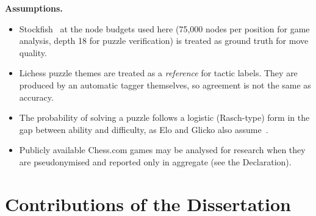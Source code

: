 \noindent\textbf{Assumptions.}
\begin{itemize}
  \item Stockfish~\cite{stockfish} at the node budgets used here (75,000 nodes per position for game
        analysis, depth 18 for puzzle verification) is treated as ground truth for move quality.
  \item Lichess puzzle themes are treated as a \emph{reference} for tactic labels. They are produced
        by an automatic tagger themselves, so agreement is not the same as accuracy.
  \item The probability of solving a puzzle follows a logistic (Rasch-type) form in the gap between
        ability and difficulty, as Elo and Glicko also assume~\cite{elo1978rating,glickman1999parameter}.
  \item Publicly available Chess.com games may be analysed for research when they are pseudonymised
        and reported only in aggregate (see the Declaration).
\end{itemize}

\section{Contributions of the Dissertation}

